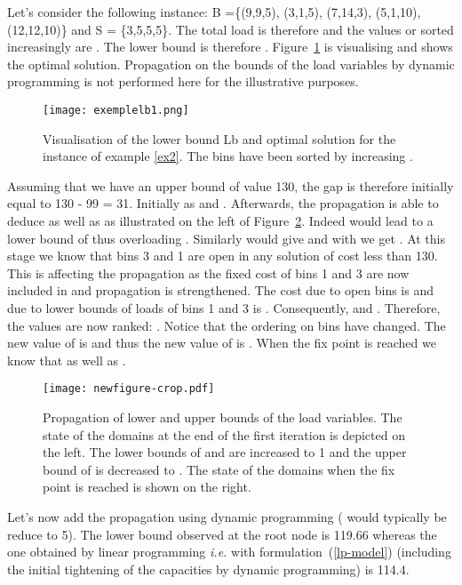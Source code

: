 \begin{example}\label{ex2}Let's consider the following instance:  B =\{(9,9,5), (3,1,5), (7,14,3), (5,1,10), (12,12,10)\} and S = \{3,5,5,5\}. 
The total load is therefore  and the values or  sorted increasingly are . The lower bound is therefore . Figure~\ref{example2} is  visualising   and shows the optimal solution. Propagation on the bounds of the load variables by dynamic programming is not performed here for the illustrative purposes.



\begin{figure}[t!]
\centering
\texttt{[image: exemplelb1.png]}
\caption{Visualisation of the lower bound Lb and optimal solution for the instance of example \ref{ex2}. The bins have been sorted by increasing .} \label{example2}
\end{figure}

Assuming that we have an upper bound  of value 130, the gap is therefore initially equal to 130 - 99 = 31. 
Initially  as  and . 
Afterwards, the propagation is able to deduce  as well as  as illustrated on the left of Figure~\ref{example3}. Indeed  would lead to a lower bound of  thus overloading . Similarly  would give  and with  we get . At this stage we know that bins 3 and 1 are open in any solution of cost less than 130. This is affecting the propagation as the fixed cost of bins 1 and 3 are now  included in  and propagation is strengthened.
The  cost due to open bins is  and due to  lower bounds of loads of bins 1 and 3 is .
Consequently,  and .
Therefore, 
the  values are now ranked: 
. Notice that the ordering on bins have changed.
The new value of  is  and thus 
the new value of   is . 
When the fix point is reached we know that  as well as .
 
\begin{figure}[t!]
\centering
\texttt{[image: newfigure-crop.pdf]} \caption{Propagation of lower and upper bounds of the load variables. 
The state of the domains at the end of the first iteration is depicted on the left.
The lower bounds of  and  are increased to 1 and 
 the upper bound of  is decreased to .
The state of the domains when the fix point is reached is shown on the right.}
\label{example3}
\end{figure}

Let's now add the propagation using dynamic programming ( would typically be reduce to 5). The lower bound observed at the root node is 119.66 whereas the one obtained by linear programming \emph{i.e.} with formulation~(\ref{lp-model}) (including the initial tightening of the capacities by dynamic programming) is 114.4.
\end{example}


